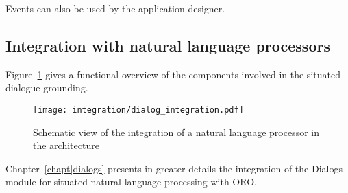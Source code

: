 Events can also be used by the application designer.


\subsection{Integration with natural language processors}

Figure~\ref{fig|dialog-integration} gives a functional overview of the
components involved in the situated dialogue grounding.

\begin{figure}
    \centering
    \texttt{[image: integration/dialog\_integration.pdf]}
    \caption{Schematic view of the integration of a natural language processor
    in the architecture}
    \label{fig|dialog-integration}
\end{figure}

Chapter~\ref{chapt|dialogs} presents in greater details the integration of
the {\sc Dialogs} module for situated natural language processing with ORO.


